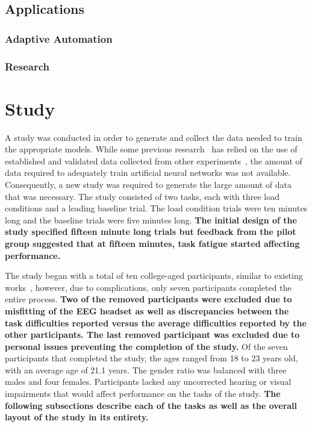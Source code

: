 \documentclass[11pt]{article}
\begin{document}
	\subsection{Applications}
	
		\subsubsection{Adaptive Automation}
		
		\subsubsection{Research}

\section{Study}
A study was conducted in order to generate and collect the data needed to train the appropriate models. While some previous research~\cite{cross research I believe} has relied on the use of established and validated data collected from other experiments~\cite{main Wilson paper}, the amount of data required to adequately train artificial neural networks was not available. Consequently, a new study was required to generate the large amount of data that was necessary. The study consisted of two tasks, each with three load conditions and a leading baseline trial. The load condition trials were ten minutes long and the baseline trials were five minutes long. 
{\bf The initial design of the study specified fifteen minute long trials but feedback from the pilot group suggested that at fifteen minutes, task fatigue started affecting performance. } %


The study began with a total of ten college-aged participants, similar to existing works~\cite{ ... }, however, due to complications, only seven participants completed the entire process. 
{\bf Two of the removed participants were excluded due to misfitting of the EEG headset as well as discrepancies between the task difficulties reported versus the average difficulties reported by the other participants. The last removed participant was excluded due to personal issues preventing the completion of the study.} %
Of the seven participants that completed the study, the ages ranged from 18 to 23 years old, with an average age of 21.1 years. The gender ratio was balanced with three males and four females. Participants lacked any uncorrected hearing or visual impairments that would affect performance on the tasks of the study. 
{\bf The following subsections describe each of the tasks as well as the overall layout of the study in its entirety. } %
	
\end{document}
